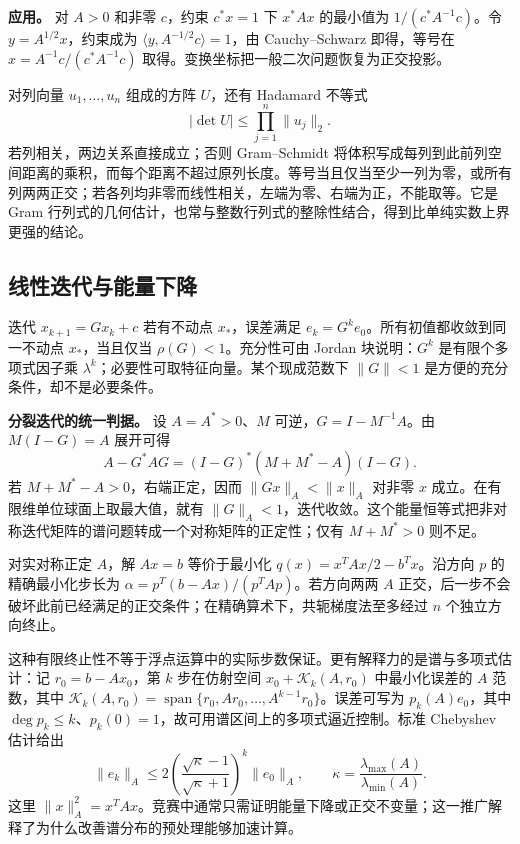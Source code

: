 \documentclass[UTF8,12pt,a4paper,fontset=fandol]{ctexart}
\begin{document}
\textbf{应用。} 对 $A>0$ 和非零 $c$，约束 $c^*x=1$ 下 $x^*Ax$ 的最小值为 $1/(c^*A^{-1}c)$。令 $y=A^{1/2}x$，约束成为 $\langle y,A^{-1/2}c\rangle=1$，由 Cauchy--Schwarz 即得，等号在 $x=A^{-1}c/(c^*A^{-1}c)$ 取得。变换坐标把一般二次问题恢复为正交投影。

对列向量 $u_1,\ldots,u_n$ 组成的方阵 $U$，还有 Hadamard 不等式
\[
|\det U|\leq\prod_{j=1}^n\|u_j\|_2.
\]
若列相关，两边关系直接成立；否则 Gram--Schmidt 将体积写成每列到此前列空间距离的乘积，而每个距离不超过原列长度。等号当且仅当至少一列为零，或所有列两两正交；若各列均非零而线性相关，左端为零、右端为正，不能取等。它是 Gram 行列式的几何估计，也常与整数行列式的整除性结合，得到比单纯实数上界更强的结论。

\subsection{线性迭代与能量下降}

\label{app:linear-iteration}

迭代 $x_{k+1}=Gx_k+c$ 若有不动点 $x_*$，误差满足 $e_k=G^ke_0$。所有初值都收敛到同一不动点 $x_*$，当且仅当 $\rho(G)<1$。充分性可由 Jordan 块说明：$G^k$ 是有限个多项式因子乘 $\lambda^k$；必要性可取特征向量。某个现成范数下 $\|G\|<1$ 是方便的充分条件，却不是必要条件。

\textbf{分裂迭代的统一判据。} 设 $A=A^*>0$、$M$ 可逆，$G=I-M^{-1}A$。由 $M(I-G)=A$ 展开可得
\[
A-G^*AG=(I-G)^*(M+M^*-A)(I-G).
\]
若 $M+M^*-A>0$，右端正定，因而 $\|Gx\|_A<\|x\|_A$ 对非零 $x$ 成立。在有限维单位球面上取最大值，就有 $\|G\|_A<1$，迭代收敛。这个能量恒等式把非对称迭代矩阵的谱问题转成一个对称矩阵的正定性；仅有 $M+M^*>0$ 则不足。

对实对称正定 $A$，解 $Ax=b$ 等价于最小化 $q(x)=x^TAx/2-b^Tx$。沿方向 $p$ 的精确最小化步长为 $\alpha=p^T(b-Ax)/(p^TAp)$。若方向两两 $A$ 正交，后一步不会破坏此前已经满足的正交条件；在精确算术下，共轭梯度法至多经过 $n$ 个独立方向终止。

这种有限终止性不等于浮点运算中的实际步数保证。更有解释力的是谱与多项式估计：记 $r_0=b-Ax_0$，第 $k$ 步在仿射空间 $x_0+\mathcal K_k(A,r_0)$ 中最小化误差的 $A$ 范数，其中 $\mathcal K_k(A,r_0)=\operatorname{span}\{r_0,Ar_0,\ldots,A^{k-1}r_0\}$。误差可写为 $p_k(A)e_0$，其中 $\deg p_k\leq k$、$p_k(0)=1$，故可用谱区间上的多项式逼近控制。标准 Chebyshev 估计给出
\[
\|e_k\|_A\leq2\left(\frac{\sqrt\kappa-1}{\sqrt\kappa+1}\right)^k\|e_0\|_A,
\qquad\kappa=\frac{\lambda_{\max}(A)}{\lambda_{\min}(A)}.
\]
这里 $\|x\|_A^2=x^TAx$。竞赛中通常只需证明能量下降或正交不变量；这一推广解释了为什么改善谱分布的预处理能够加速计算。
\end{document}
